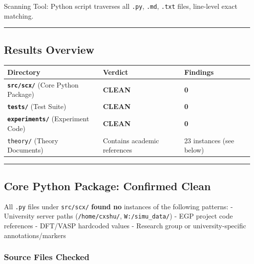 \documentclass[
  12pt,
]{article}
\begin{document}
Scanning Tool: Python script traverses all \texttt{.py}, \texttt{.md}, \texttt{.txt}
files, line-level exact matching.

\begin{center}\rule{0.5\linewidth}{0.5pt}\end{center}

\subsection{Results Overview}\label{results-overview}

\begin{longtable}[]{@{}lll@{}}
\toprule\noalign{}
Directory & Verdict & Findings \\
\midrule\noalign{}
\endhead
\bottomrule\noalign{}
\endlastfoot
\textbf{\texttt{src/scx/}} (Core Python Package) & \textbf{CLEAN} &
\textbf{0} \\
\textbf{\texttt{tests/}} (Test Suite) & \textbf{CLEAN} & \textbf{0} \\
\textbf{\texttt{experiments/}} (Experiment Code) & \textbf{CLEAN} &
\textbf{0} \\
\texttt{theory/} (Theory Documents) & Contains academic references & 23 instances (see below) \\
\end{longtable}

\begin{center}\rule{0.5\linewidth}{0.5pt}\end{center}

\subsection{Core Python Package: Confirmed Clean}\label{core-python-package-confirmed-clean}

All \texttt{.py} files under \texttt{src/scx/} \textbf{found no} instances of the following patterns: -
University server paths (\texttt{/home/cxshu/}, \texttt{W:/simu\_data/}) - EGP
project code references - DFT/VASP hardcoded values - Research group or university-specific annotations/markers

\subsubsection{Source Files Checked}\label{source-files-checked}
\end{document}
